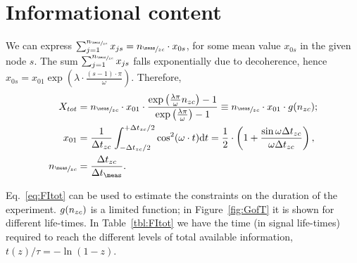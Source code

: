 \documentclass{article}
\begin{document}
\section{Informational content}
\newcommand{\dtnd}{\dt_{zc}}

We can express $\sum_{j=1}^{\Nmnd} x_{js} = \Nmnd \cdot x_{0s}$, for some mean value $x_{0s}$ in the given node $s$. The sum $\sum_{j=1}^{\Nmnd} x_{js}$ falls exponentially due to decoherence, hence $x_{0s} = x_{01}\exp{(\lambda\cdot \frac{(s-1)\cdot\pi}{\omega})}$. Therefore,
\begin{align}
	X_{tot} & = \Nmnd\cdot x_{01} \cdot \frac{\exp{\bkt{\frac{\lambda\pi}{\omega}\Nnd}}-1}{\exp{\bkt{\frac{\lambda\pi}{\omega}}}-1} 
	\equiv \Nmnd \cdot x_{01}\cdot g(\Nnd); \label{eq:FItot}\\
	x_{01}  & = \frac{1}{\dtnd}\int_{-\dtnd/2}^{+\dtnd/2}\cos^2(\omega\cdot t)\td t = \frac12\cdot \bkt{1 + \frac{\sin\omega\dtnd}{\omega\dtnd}},                                    \label{eq:MeanFIZC}   \\
	\Nmnd   & = \frac{\dtnd}{\dtm}. \label{eq:NumMeasNode}
\end{align}

Eq.~\eqref{eq:FItot} can be used to estimate the constraints on the duration of the experiment. $g({n_{zc}})$ is a limited function; in Figure~\ref{fig:GofT} it is shown for different life-times. In Table~\ref{tbl:FItot} we have the time (in signal life-times) required to reach the different levels of total available information, $t(z)/\tau = -\ln(1-z)$. 
\end{document}

